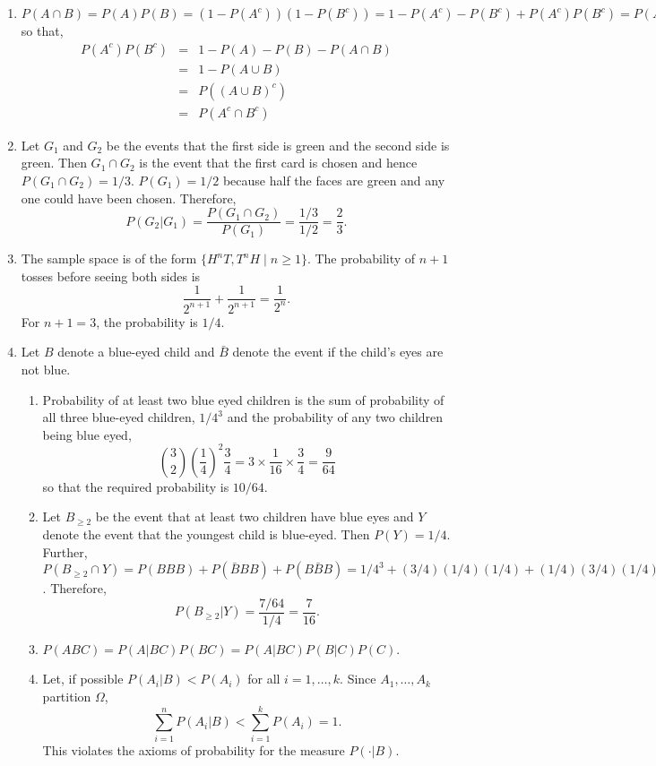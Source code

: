 \documentclass{article}
\begin{document}
\begin{enumerate}
\item[11.] $P(A \cap B) = P(A)P(B) = (1 - P(A^c))(1 - P(B^c)) = 1 - P(A^c) - 
P(B^c) + P(A^c)P(B^c) = P(A) + P(B) - 1 + P(A^c)P(B^c)$ so that,
\begin{eqnarray*}
P(A^c)P(B^c) &=& 1 - P(A) - P(B) - P(A \cap B) \\
 &=& 1 - P(A \cup B) \\
 &=& P((A \cup B)^c) \\
 &=& P(A^c \cap B^c)
\end{eqnarray*}

\item[12.] Let $G_1$ and $G_2$ be the events that the first side is green and the
second side is green. Then $G_1 \cap G_2$ is the event that the first card is 
chosen and hence $P(G_1 \cap G_2) = 1/3$. $P(G_1) = 1/2$ because half the faces
are green and any one could have been chosen. Therefore,
\[
P(G_2 | G_1) = \frac{P(G_1 \cap G_2)}{P(G_1)} = \frac{1/3}{1/2} = \frac{2}{3}.
\]

\item[13.] The sample space is of the form $\{H^nT, T^nH \;|\; n \ge 1\}$. The
probability of $n + 1$ tosses before seeing both sides is 
\[
\frac{1}{2^{n+1}} + \frac{1}{2^{n+1}} = \frac{1}{2^n}.
\]
For $n + 1 = 3$, the probability is $1/4$.

\item[14.] Let $B$ denote a blue-eyed child and $\bar{B}$ denote the event if the
child's eyes are not blue.
\begin{enumerate}
\item Probability of at least two blue eyed children is the sum of probability of
all three blue-eyed children, $1/4^3$ and the probability of any two children
being blue eyed,
\[
\binom{3}{2}\left(\frac{1}{4}\right)^2\frac{3}{4} = 3\times\frac{1}{16}\times\frac{3}{4}
= \frac{9}{64}
\]
so that the required probability is $10/64$.

\item[15.] Let $B_{\ge 2}$ be the event that at least two children have blue eyes 
and $Y$ denote the event that the youngest child is blue-eyed. Then $P(Y) = 1/4$.
Further, $P(B_{\ge 2} \cap Y) = P(BBB) + P(\bar{B}BB) + P(B\bar{B}B) = 1/4^3 +
(3/4)(1/4)(1/4) + (1/4)(3/4)(1/4) = 7/64$. Therefore,
\[
P(B_{\ge 2} | Y) = \frac{7/64}{1/4} = \frac{7}{16}.
\]

\item[17.] $P(ABC) = P(A|BC)P(BC) = P(A|BC)P(B|C)P(C)$.

\item[18.] Let, if possible $P(A_i | B) < P(A_i)$ for all $i = 1, \ldots, k$. 
Since $A_1, \ldots, A_k$ partition $\Omega$,
\[
\sum_{i=1}^n P(A_i|B) < \sum_{i=1}^k P(A_i) = 1.
\]
This violates the axioms of probability for the measure $P(\cdot|B)$.
\end{enumerate}


\end{enumerate}
\end{document}
